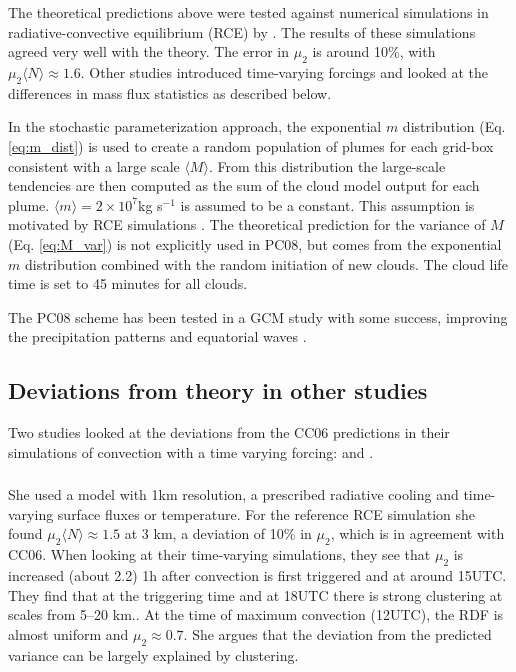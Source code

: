 \documentclass[a4paper, 12pt]{article}
\begin{document}
The theoretical predictions above were tested against numerical simulations in radiative-convective equilibrium (RCE) by \cite{Cohen2006}. The results of these simulations agreed very well with the theory. The error in $\mu_2$ is around 10\%, with $\mu_2 \langle N \rangle \approx 1.6$. Other studies introduced time-varying forcings and looked at the differences in mass flux statistics as described below.

In the \cite[][PC08]{Plant2008} stochastic parameterization approach, the exponential $m$ distribution (Eq. \ref{eq:m_dist}) is used to create a random population of plumes for each grid-box consistent with a large scale $\langle M \rangle$. From this distribution the large-scale tendencies are then computed as the sum of the cloud model output for each plume. $\langle m \rangle = 2 \times 10^7$kg s$^{-1}$ is assumed to be a constant. This assumption is motivated by RCE simulations \citep[e.g.][]{Cohen2006}. The theoretical prediction for the variance of $M$ (Eq. \ref{eq:M_var}) is not explicitly used in PC08, but comes from the exponential $m$ distribution combined with the random initiation of new clouds. The cloud life time is set to 45 minutes for all clouds. 

The PC08 scheme has been tested in a GCM study with some success, improving the precipitation patterns and equatorial waves \citep{Wang2016}.

\subsection{Deviations from theory in other studies}
Two studies looked at the deviations from the CC06 predictions in their simulations of convection with a time varying forcing: \cite{Davies2008} and \cite{Davoudi2010}.

\subsubsection{\cite{Davies2008}}
She used a model with 1km resolution, a prescribed radiative cooling and time-varying surface fluxes or temperature. For the reference RCE simulation she found $\mu_2 \langle N \rangle \approx 1.5$ at 3 km, a deviation of 10\% in $\mu_2$, which is in agreement with CC06. When looking at their time-varying simulations, they see that $\mu_2$ is increased (about 2.2) 1h after convection is first triggered and at around 15UTC. They find that at the triggering time and at 18UTC there is strong clustering at scales from 5--20 km.. At the time of maximum convection (12UTC), the RDF is almost uniform and $\mu_2 \approx 0.7$. She argues that the deviation from the predicted variance can be largely explained by clustering. 
\end{document}
